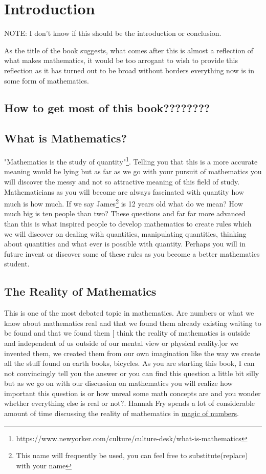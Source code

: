 \chapter{Introduction} %
NOTE: I don't know if this should be the introduction or conclusion.

As the title of the book suggests, what comes after this is almost a reflection of what makes mathematics, it would be too arrogant to wish to provide this reflection as it has turned out to be broad without borders everything now is in some form of mathematics.
\section{How to get most of this book????????}
\section{What is Mathematics?}
"Mathematics is the study of quantity"\footnote[1]{https://www.newyorker.com/culture/culture-desk/what-is-mathematics}. Telling you that this is a more accurate meaning would be lying but as far as we go with your pursuit of mathematics you will discover the messy and not so attractive meaning of this field of study. Mathematicians as you will become are always fascinated with quantity how much is how much. If we say James\footnote[1]{This name will frequently be used, you can feel free to substitute(replace) with your name} is 12 years old what do we mean? How much big is ten people than two? These questions and far far more advanced than this is what inspired people to develop mathematics to create rules which we will discover on dealing with quantities, manipulating quantities, thinking about quantities and what ever is possible with quantity. Perhaps you will in future invent or discover some of these rules as you become a better mathematics student.

\section{The Reality of Mathematics}
This is one of the most debated topic in mathematics. Are numbers or what we know about mathematics real and that we found them already existing waiting to be found and that we found them [ think the reality of mathematics is outside and independent of us outside of our mental view or physical reality.]or we invented them, we created them from our own imagination like the way we create all the stuff found on earth books, bicycles. As you are starting this book, I can not convincingly tell you the answer or you can find this question a little bit silly but as we go on with our discussion on mathematics you will realize how important this question is or how unreal some math concepts are and you wonder whether everything else is real or not?. Hannah Fry spends a lot of considerable amount of time discussing the reality of mathematics in \href{https://www.youtube.com/watch?v=cyvDG8qjt-M&list=PLVk3tArtG-kju2RYzpvh99RiL8hHA9ORV}{magic of numbers}.
